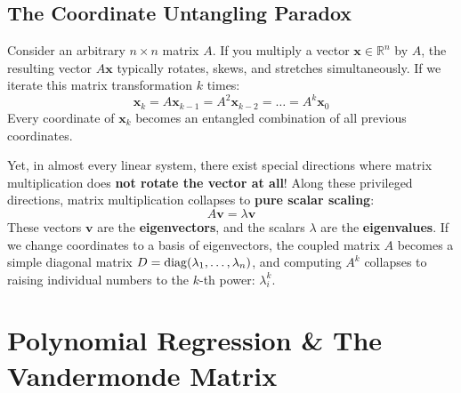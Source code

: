\subsection{The Coordinate Untangling Paradox}
Consider an arbitrary $n \times n$ matrix $A$. If you multiply a vector $\mathbf{x} \in \mathbb{R}^n$ by $A$, the resulting vector $A\mathbf{x}$ typically rotates, skews, and stretches simultaneously. If we iterate this matrix transformation $k$ times:
\begin{equation}
\mathbf{x}_k = A \mathbf{x}_{k-1} = A^2 \mathbf{x}_{k-2} = \dots = A^k \mathbf{x}_0
\end{equation}
Every coordinate of $\mathbf{x}_k$ becomes an entangled combination of all previous coordinates.

Yet, in almost every linear system, there exist special directions where matrix multiplication does \textbf{not rotate the vector at all}! Along these privileged directions, matrix multiplication collapses to \textbf{pure scalar scaling}:
\begin{equation}
A\mathbf{v} = \lambda \mathbf{v}
\end{equation}
These vectors $\mathbf{v}$ are the \textbf{eigenvectors}, and the scalars $\lambda$ are the \textbf{eigenvalues}. If we change coordinates to a basis of eigenvectors, the coupled matrix $A$ becomes a simple diagonal matrix $D = \operatorname{diag}(\lambda_1, \dots, \lambda_n)$, and computing $A^k$ collapses to raising individual numbers to the $k$-th power: $\lambda_i^k$.

\section{Polynomial Regression \& The Vandermonde Matrix}


